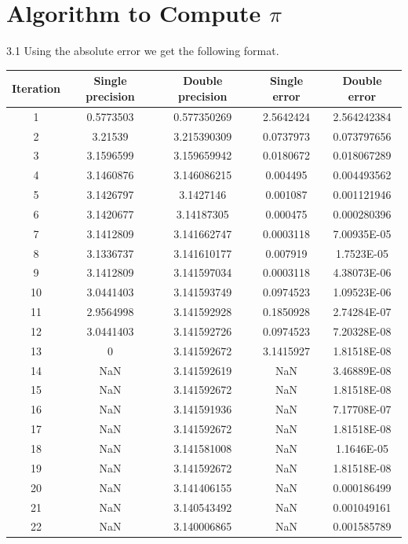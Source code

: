 \documentclass{article}
\begin{document}
\section{Algorithm to Compute $\pi$}
3.1 Using the absolute error we get the following format.
\begin{center}
\begin{longtable}{|c|c|c|c|c|}
Iteration	&	Single precision	&	Double precision	&	Single error	&	Double error	\\ \hline
1	&	0.5773503	&	0.577350269	&	2.5642424	&	2.564242384	\\ \hline
2	&	3.21539	&	3.215390309	&	0.0737973	&	0.073797656	\\ \hline
3	&	3.1596599	&	3.159659942	&	0.0180672	&	0.018067289	\\ \hline
4	&	3.1460876	&	3.146086215	&	0.004495	&	0.004493562	\\ \hline
5	&	3.1426797	&	3.1427146	&	0.001087	&	0.001121946	\\ \hline
6	&	3.1420677	&	3.14187305	&	0.000475	&	0.000280396	\\ \hline
7	&	3.1412809	&	3.141662747	&	0.0003118	&	7.00935E-05	\\ \hline
8	&	3.1336737	&	3.141610177	&	0.007919	&	1.7523E-05	\\ \hline
9	&	3.1412809	&	3.141597034	&	0.0003118	&	4.38073E-06	\\ \hline
10	&	3.0441403	&	3.141593749	&	0.0974523	&	1.09523E-06	\\ \hline
11	&	2.9564998	&	3.141592928	&	0.1850928	&	2.74284E-07	\\ \hline
12	&	3.0441403	&	3.141592726	&	0.0974523	&	7.20328E-08	\\ \hline
13	&	0	&	3.141592672	&	3.1415927	&	1.81518E-08	\\ \hline
14	&	NaN	&	3.141592619	&	NaN	&	3.46889E-08	\\ \hline
15	&	NaN	&	3.141592672	&	NaN	&	1.81518E-08	\\ \hline
16	&	NaN	&	3.141591936	&	NaN	&	7.17708E-07	\\ \hline
17	&	NaN	&	3.141592672	&	NaN	&	1.81518E-08	\\ \hline
18	&	NaN	&	3.141581008	&	NaN	&	1.1646E-05	\\ \hline
19	&	NaN	&	3.141592672	&	NaN	&	1.81518E-08	\\ \hline
20	&	NaN	&	3.141406155	&	NaN	&	0.000186499	\\ \hline
21	&	NaN	&	3.140543492	&	NaN	&	0.001049161	\\ \hline
22	&	NaN	&	3.140006865	&	NaN	&	0.001585789	\\ \hline

\end{longtable}
\end{center}
\end{document}
